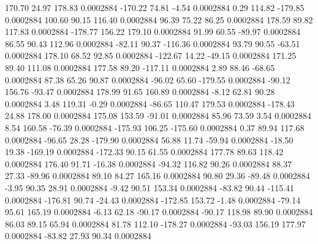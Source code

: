       170.70       24.97      178.83     0.0002884
     -170.22       74.81       -4.54     0.0002884
        0.29      114.82     -179.85     0.0002884
      100.60       90.15      116.40     0.0002884
       96.39       75.22       86.25     0.0002884
      178.59       89.82      117.83     0.0002884
     -178.77      156.22      179.10     0.0002884
       91.99       60.55      -89.97     0.0002884
       86.55       90.43      112.96     0.0002884
      -82.11       90.37     -116.36     0.0002884
       93.79       90.55      -63.51     0.0002884
      178.10       68.52       92.85     0.0002884
     -122.67       14.22      -49.15     0.0002884
      171.25       89.40      111.08     0.0002884
      177.58       89.20     -117.11     0.0002884
        2.89       88.46      -68.65     0.0002884
       87.38       65.26       90.87     0.0002884
      -96.02       65.60     -179.55     0.0002884
      -90.12      156.76      -93.47     0.0002884
      178.99       91.65      160.89     0.0002884
       -8.12       62.81       90.28     0.0002884
        3.48      119.31       -0.29     0.0002884
      -86.65      110.47      179.53     0.0002884
     -178.43       24.88      178.00     0.0002884
      175.08      153.59      -91.01     0.0002884
       85.96       73.59        3.54     0.0002884
        8.54      160.58      -76.39     0.0002884
     -175.93      106.25     -175.60     0.0002884
        0.37       89.94      117.68     0.0002884
      -96.65       28.28     -179.90     0.0002884
       56.88       11.74      -59.94     0.0002884
      -18.50       19.38     -169.19     0.0002884
     -172.33       90.15       61.55     0.0002884
      177.78       89.63      118.42     0.0002884
      176.40       91.71      -16.38     0.0002884
      -94.32      116.82       90.26     0.0002884
       88.37       27.33      -89.96     0.0002884
       89.10       84.27      165.16     0.0002884
       90.80       29.36      -89.48     0.0002884
       -3.95       90.35       28.91     0.0002884
       -9.42       90.51      153.34     0.0002884
      -83.82       90.44     -115.41     0.0002884
     -176.81       90.74      -24.43     0.0002884
     -172.85      153.72       -1.48     0.0002884
      -79.14       95.61      165.19     0.0002884
       -6.13       62.18      -90.17     0.0002884
      -90.17      118.98       89.90     0.0002884
       86.03       89.15       65.94     0.0002884
       81.78      112.10     -178.27     0.0002884
      -93.03      156.19      177.97     0.0002884
      -83.82       27.93       90.34     0.0002884
